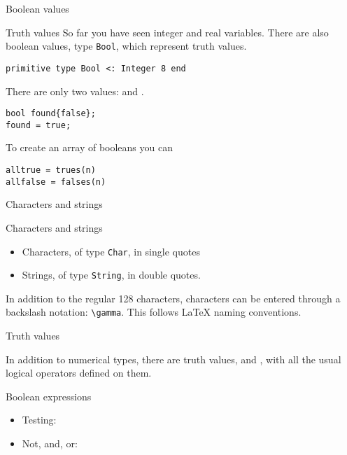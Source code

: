  {Boolean values}

\begin{block}{Truth values}
  \label{sl:bool-varj}
  So far you have seen integer and real variables. There are also
  boolean values, type \lstinline{Bool}, which represent truth values. 
\begin{lstlisting}
primitive type Bool <: Integer 8 end    
\end{lstlisting}
  There are
  only two values:  and .
\begin{lstlisting}
bool found{false};
found = true;
\end{lstlisting}
\end{block}

To create an array of booleans you can 
\begin{lstlisting}
alltrue = trues(n)
allfalse = falses(n)
\end{lstlisting}

 {Characters and strings}

\begin{block}{Characters and strings}
  \begin{itemize}
  \item Characters, of type \lstinline{Char}, in single quotes
  \item Strings, of type \lstinline{String}, in double quotes.
  \end{itemize}
  In addition to the regular 128  characters,
   characters can be entered through a backslash notation:
  \verb+\gamma+. This follows \LaTeX{} naming conventions.
\end{block}


 {Truth values}

In addition to numerical types, there are truth values,
 and , with all the usual logical
operators defined on them.

\begin{block}{Boolean expressions}
  \label{sl:bool-exprj}
  \begin{itemize}
  \item Testing: \n{== != < > <= >=}
  \item Not, and, or:   \n{! && ||}
  \end{itemize}
\end{block}

